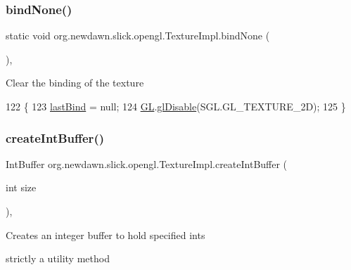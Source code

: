 \subsubsection{\texorpdfstring{bind\+None()}{bindNone()}}
{\footnotesize\ttfamily static void org.\+newdawn.\+slick.\+opengl.\+Texture\+Impl.\+bind\+None (\begin{DoxyParamCaption}{ }\end{DoxyParamCaption})\hspace{0.3cm}{\ttfamily [inline]}, {\ttfamily [static]}}

Clear the binding of the texture 
\begin{DoxyCode}
122                                   \{
123         \mbox{\hyperlink{classorg_1_1newdawn_1_1slick_1_1opengl_1_1_texture_impl_ae726e8066199fe500031c7058f3459c3}{lastBind}} = null;
124         \mbox{\hyperlink{classorg_1_1newdawn_1_1slick_1_1opengl_1_1_texture_impl_ad672b5a41ba59c882980c429c09b6572}{GL}}.\mbox{\hyperlink{interfaceorg_1_1newdawn_1_1slick_1_1opengl_1_1renderer_1_1_s_g_l_a3b47b402f84bc1404e6b218264981bb5}{glDisable}}(SGL.GL\_TEXTURE\_2D);
125     \}
\end{DoxyCode}
\mbox{\label{classorg_1_1newdawn_1_1slick_1_1opengl_1_1_texture_impl_af4a074ccdfc1a61d9ee75dc3430755ac}} 
\subsubsection{\texorpdfstring{create\+Int\+Buffer()}{createIntBuffer()}}
{\footnotesize\ttfamily Int\+Buffer org.\+newdawn.\+slick.\+opengl.\+Texture\+Impl.\+create\+Int\+Buffer (\begin{DoxyParamCaption}\item[{int}]{size }\end{DoxyParamCaption})\hspace{0.3cm}{\ttfamily [inline]}, {\ttfamily [protected]}}

Creates an integer buffer to hold specified ints
\begin{DoxyItemize}
\item strictly a utility method
\end{DoxyItemize}


